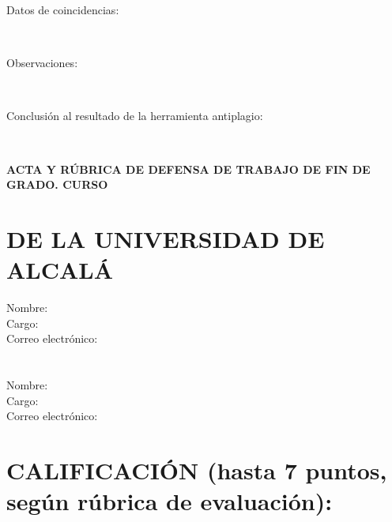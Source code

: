 \documentclass[11pt,a4paper,oneside]{article}
\begin{document}
\begin{description}
  \item[Datos de coincidencias:] ~
        \vspace{5cm}
  \item[Observaciones:] ~
        \vspace{5cm}
  \item[Conclusión al resultado de la herramienta antiplagio:] ~
        \vspace{5cm}
\end{description}

\newpage

\thispagestyle{plain}

\noindent \textbf{ACTA Y RÚBRICA DE DEFENSA DE TRABAJO DE FIN DE GRADO. CURSO \myThesisAcademicYear}

\vspace{0.5cm}

\section*{\MakeUppercase{\wordTutorOrTutora} \MakeUppercase{\wordAcademicoOrAcademica} DE LA UNIVERSIDAD DE ALCALÁ}

\begin{description}
  \item[Nombre:] \myAcademicTutorFullName
  \item[Cargo:] \myAcademicTutorPosition
  \item[Correo electrónico:] \myAcademicTutorEmail
\end{description}

\vspace{0.25cm}

\ifthenelse{\equal{\myCoTutorFullName}{}}
{
}
{
\section*{\MakeUppercase{\wordCoTutorOrCoTutora}}

\begin{description}
  \item[Nombre:] \myCoTutorFullName
  \item[Cargo:] \myCoTutorPosition
  \item[Correo electrónico:] \myCoTutorEmail
\end{description}
}

\vspace{0.25cm}

\section*{CALIFICACIÓN (hasta 7 puntos, según rúbrica de evaluación):  \myAcademicTutorGrade}
\end{document}
